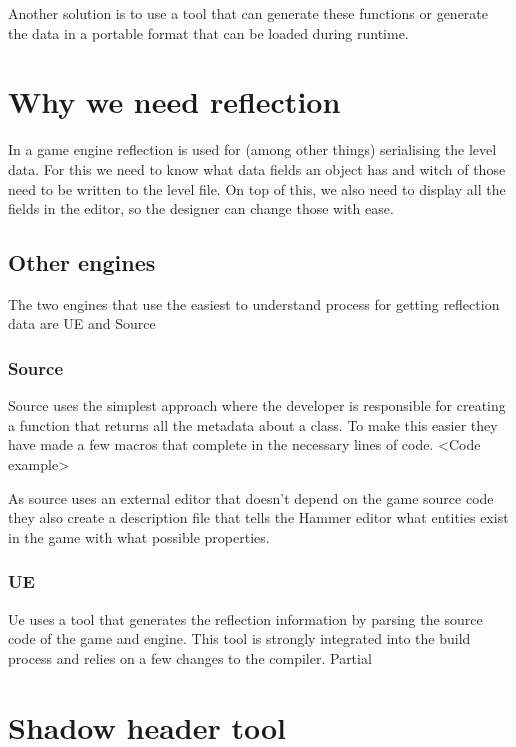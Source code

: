 Another solution is to use a tool that can generate these functions or generate the data in a portable format that can be loaded during runtime.


\section{Why we need reflection}\label{sec:why-we-need-reflection}

In a game engine reflection is used for (among other things) serialising the level data.
For this we need to know what data fields an object has and witch of those need to be written to the level file.
On top of this, we also need to display all the fields in the editor, so the designer can change those with ease.

\subsection{Other engines}

The two engines that use the easiest to understand process for getting reflection data are UE and Source

\subsubsection{Source}
Source uses the simplest approach where the developer is responsible for creating a function that returns all the metadata about a class.
To make this easier they have made a few macros that complete in the necessary lines of code.
<Code example>

As source uses an external editor that doesn't depend on the game source code they also create a description file that tells the Hammer editor what entities exist in the game with what possible properties.

\subsubsection{UE}

Ue uses a tool that generates the reflection information by parsing the source code of the game and engine.
This tool is strongly integrated into the build process and relies on a few changes to the compiler.
Partial


\section{Shadow header tool}\label{sec:shadow-header-tool}

